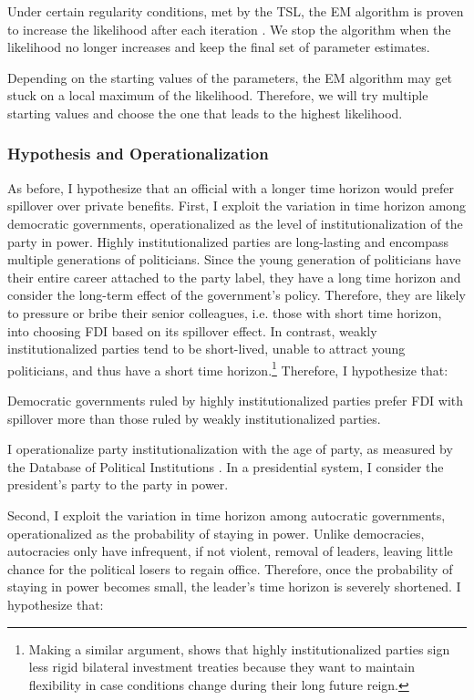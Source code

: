 Under certain regularity conditions, met by the TSL, the EM algorithm is proven to increase the likelihood after each iteration \citep[152]{Logan1998}. We stop the algorithm when the likelihood no longer increases and keep the final set of parameter estimates.

Depending on the starting values of the parameters, the EM algorithm may get stuck on a local maximum of the likelihood. Therefore, we will try multiple starting values and choose the one that leads to the highest likelihood.

\subsubsection{Hypothesis and Operationalization}
\label{sec:tsl_hypothesis}

As before, I hypothesize that an official with a longer time horizon would prefer spillover over private benefits. First, I exploit the variation in time horizon among democratic governments, operationalized as the level of institutionalization of the party in power. Highly institutionalized parties are long-lasting and encompass multiple generations of politicians. Since the young generation of politicians have their entire career attached to the party label, they have a long time horizon and consider the long-term effect of the government's policy. Therefore, they are likely to pressure or bribe their senior colleagues, i.e. those with short time horizon, into choosing FDI based on its spillover effect. In contrast, weakly institutionalized parties tend to be short-lived, unable to attract young politicians, and thus have a short time horizon.\footnote{Making a similar argument, \citet{Blake2013} shows that highly institutionalized parties sign less rigid bilateral investment treaties because they want to maintain flexibility in case conditions change during their long future reign.} Therefore, I hypothesize that:

\begin{hyp}
Democratic governments ruled by highly institutionalized parties prefer FDI with spillover more than those ruled by weakly institutionalized parties.
\end{hyp}

I operationalize party institutionalization with the age of party, as measured by the Database of Political Institutions \citep{Keefer2002}. In a presidential system, I consider the president's party to the party in power.

Second, I exploit the variation in time horizon among autocratic governments, operationalized as the probability of staying in power. Unlike democracies, autocracies only have infrequent, if not violent, removal of leaders, leaving little chance for the political losers to regain office. Therefore, once the probability of staying in power becomes small, the leader's time horizon is severely shortened. I hypothesize that:

